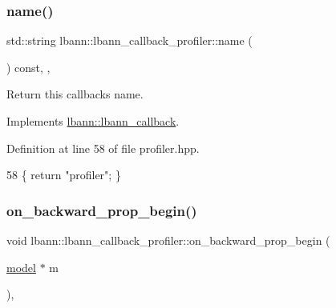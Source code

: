 \mbox{\label{classlbann_1_1lbann__callback__profiler_ac58447afa0642c1a466d9b58f0de87c8}} 
\subsubsection{\texorpdfstring{name()}{name()}}
{\footnotesize\ttfamily std\+::string lbann\+::lbann\+\_\+callback\+\_\+profiler\+::name (\begin{DoxyParamCaption}{ }\end{DoxyParamCaption}) const\hspace{0.3cm}{\ttfamily [inline]}, {\ttfamily [override]}, {\ttfamily [virtual]}}

Return this callback\textquotesingle{}s name. 

Implements \hyperlink{classlbann_1_1lbann__callback_a7522c7a14f1d6a1ea762cc2d7248eb3a}{lbann\+::lbann\+\_\+callback}.



Definition at line 58 of file profiler.\+hpp.


\begin{DoxyCode}
58 \{ \textcolor{keywordflow}{return} \textcolor{stringliteral}{"profiler"}; \}
\end{DoxyCode}
\mbox{\label{classlbann_1_1lbann__callback__profiler_a7905ac8f79a71731c8e388cdb4385023}} 
\subsubsection{\texorpdfstring{on\+\_\+backward\+\_\+prop\+\_\+begin()}{on\_backward\_prop\_begin()}\hspace{0.1cm}{\footnotesize\ttfamily [1/2]}}
{\footnotesize\ttfamily void lbann\+::lbann\+\_\+callback\+\_\+profiler\+::on\+\_\+backward\+\_\+prop\+\_\+begin (\begin{DoxyParamCaption}\item[{\hyperlink{classlbann_1_1model}{model} $\ast$}]{m }\end{DoxyParamCaption})\hspace{0.3cm}{\ttfamily [override]}, {\ttfamily [virtual]}}

